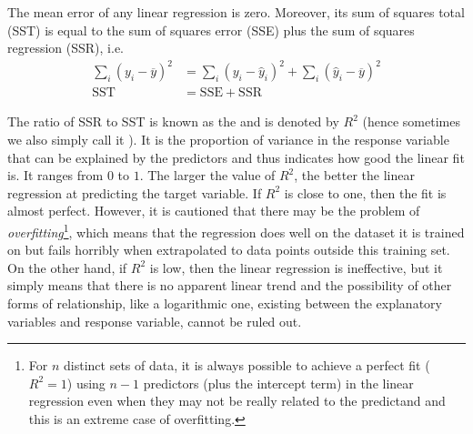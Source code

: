 \begin{proper}
The mean error of any linear regression is zero. Moreover, its sum of squares total (SST) is equal to the sum of squares error (SSE) plus the sum of squares regression (SSR), i.e.\ 
\begin{align*}
\sum_i (y_i - \overline{y})^2 &= \sum_i (y_i - \hat{y}_i)^2 + \sum_i (\hat{y}_i - \overline{y})^2 \\
\text{SST} &= \text{SSE} + \text{SSR}   
\end{align*}
\end{proper}
The ratio of SSR to SST is known as the  and is denoted by $R^2$ (hence sometimes we also simply call it ). It is the proportion of variance in the response variable that can be explained by the predictors and thus indicates how good the linear fit is. It ranges from $0$ to $1$. The larger the value of $R^2$, the better the linear regression at predicting the target variable. If $R^2$ is close to one, then the fit is almost perfect. However, it is cautioned that there may be the problem of \textit{overfitting}\footnote{For $n$ distinct sets of data, it is always possible to achieve a perfect fit ($R^2 = 1$) using $n-1$ predictors (plus the intercept term) in the linear regression even when they may not be really related to the predictand and this is an extreme case of overfitting.}, which means that the regression does well on the dataset it is trained on but fails horribly when extrapolated to data points outside this training set. On the other hand, if $R^2$ is low, then the linear regression is ineffective, but it simply means that there is no apparent linear trend and the possibility of other forms of relationship, like a logarithmic one, existing between the explanatory variables and response variable, cannot be ruled out.

